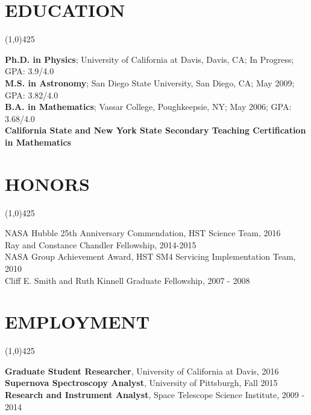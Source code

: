 \documentclass{res}
\begin{document}
\begin{resume}
\section{EDUCATION}
\vspace{-.2in} 
\begin{center}
\line(1,0){425}
\end{center}
\vspace{-.3in} 
\vspace{0.1in} 
 
   {\bf Ph.D. in Physics}; University of California at Davis, Davis, CA; In Progress; GPA: 3.9/4.0 \\
   {\bf M.S. in Astronomy}; San Diego State University, San Diego, CA; May 2009; GPA: 3.82/4.0 \\
   {\bf B.A. in Mathematics}; Vassar College, Poughkeepsie, NY; May 2006; GPA: 3.68/4.0 \\   
   {\bf California State and New York State Secondary Teaching Certification in Mathematics} 
\section{HONORS}
\vspace{-.2in} 
\begin{center}
\line(1,0){425}
\end{center}
\vspace{-.3in} 
\vspace{0.1in} 

NASA Hubble 25th Anniversary Commendation, HST Science Team, 2016 \\ %
Ray and Constance Chandler Fellowship, 2014-2015 \\
NASA Group Achievement Award, HST SM4 Servicing Implementation Team, 2010 \\
Cliff E. Smith and Ruth Kinnell Graduate Fellowship, 2007 - 2008 \\
 
\section{EMPLOYMENT}
\vspace{-.2in} 
\begin{center}
\line(1,0){425}
\end{center}
\vspace{-.3in} 
\vspace{0.1in} 

    {\bf Graduate Student Researcher}, University of California at Davis, 2016 \\
    {\bf Supernova Spectroscopy Analyst}, University of Pittsburgh, Fall 2015 \\
    {\bf Research and Instrument Analyst}, Space Telescope Science Institute, 2009 - 2014 \\   
    

\end{resume}
\end{document}
